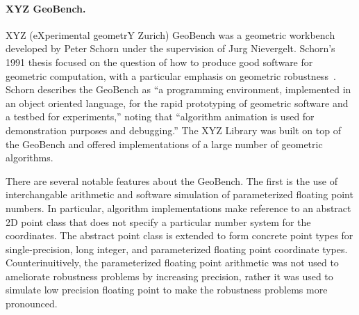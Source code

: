 \paragraph{XYZ GeoBench.}

XYZ (eXperimental geometrY Zurich) GeoBench was a geometric workbench developed
by Peter Schorn under the supervision of Jurg Nievergelt. Schorn's 1991 thesis
focused on the question of how to produce good software for geometric
computation, with a particular emphasis on geometric
robustness~\cite{schorn1991robust}. Schorn describes the
GeoBench as ``a programming environment, implemented in an object oriented
language, for the rapid prototyping of geometric software and a testbed for
experiments,'' noting that ``algorithm animation is used for demonstration
purposes and debugging.'' The XYZ Library was built on top of the GeoBench and
offered implementations of a large number of geometric algorithms. 

There are several notable features about the GeoBench. The first is the use of
interchangable arithmetic and software simulation of parameterized floating
point numbers. In particular, algorithm implementations make reference to an
abstract 2D point class that does not specify a particular number system for the
coordinates. The abstract point class is extended to form concrete point types
for single-precision, long integer, and parameterized floating point coordinate
types. Counterinuitively, the parameterized floating point arithmetic was not
used to ameliorate robustness problems by increasing precision, rather it was
used to simulate low precision floating point to make the robustness problems
more pronounced.


